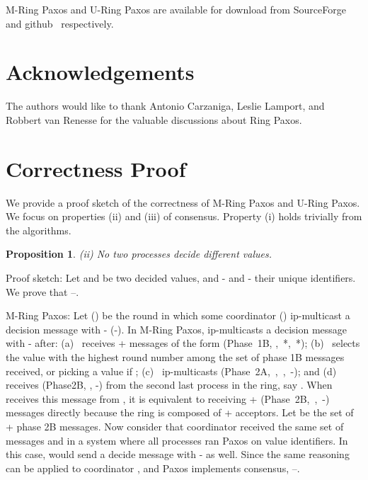\documentclass[final,3p,times,twocolumn,authoryear]{elsarticle}
\newtheorem{props}{Proposition}
\begin{document}
M-Ring Paxos and U-Ring Paxos are available for download from SourceForge~\cite{Libpaxos} and github~\cite{uringpaxos} respectively.


\section{Acknowledgements}
The authors would like to thank Antonio Carzaniga, Leslie Lamport, and Robbert van Renesse for the valuable discussions about Ring Paxos.\

 



\section*{Correctness Proof}
We provide a proof sketch of the correctness of M-Ring Paxos and U-Ring Paxos.
We focus on properties (ii) and (iii) of consensus. Property (i)
holds trivially from the algorithms.

\begin{props}
\vspace{1mm}
\hspace{-1mm}(ii) No two processes decide different values.
\end{props}
\vspace{1mm}
\noindent Proof sketch: Let  and  be two decided values, and - and - their unique identifiers. We prove that --.

\vspace{1mm}
M-Ring Paxos: Let  () be the round in which some coordinator  () ip-multicast a decision message with - (-).
In M-Ring Paxos,  ip-multicasts a decision message with - after: (a)~ receives + messages of the form (Phase~1B, ,~*,~*); (b)~ selects the value  with the highest round number  among the set  of phase 1B messages received, or picking a value  if ; (c)~ ip-multicasts  (Phase~2A,~,~,~-); and (d)~ receives (Phase2B, , -) from the second last process in the ring, say .
When  receives this message from , it is equivalent to  receiving + (Phase~2B,~,~-) messages 
directly because the ring is composed of + acceptors. Let  be the set of + phase 2B messages. Now consider that coordinator  received the same set of messages  and  in a system where all processes ran Paxos on value identifiers. In this case,  would send a decide message with - as well. Since the same reasoning can be applied to coordinator , and Paxos implements consensus, --.
\end{document}
